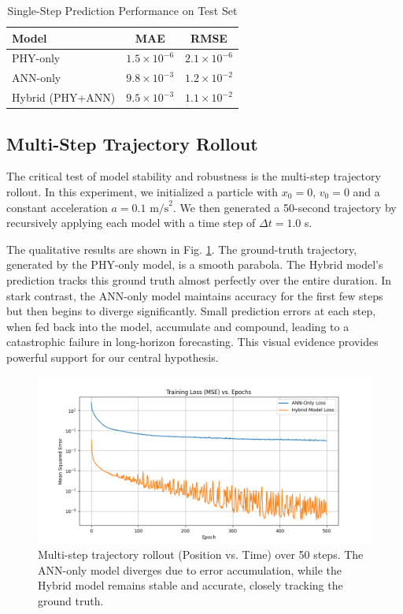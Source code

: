 \documentclass[conference]{IEEEtran}
\begin{document}
\begin{table}[htbp]
\caption{Single-Step Prediction Performance on Test Set}
\begin{center}
\begin{tabular}{|l|c|c|}
\hline
\textbf{Model} & \textbf{MAE} & \textbf{RMSE} \\
\hline
PHY-only & $1.5 \times 10^{-6}$ & $2.1 \times 10^{-6}$ \\
ANN-only & $9.8 \times 10^{-3}$ & $1.2 \times 10^{-2}$ \\
Hybrid (PHY+ANN) & $9.5 \times 10^{-3}$ & $1.1 \times 10^{-2}$ \\
\hline
\end{tabular}
\label{tab:single_step}
\end{center}
\end{table}

\subsection{Multi-Step Trajectory Rollout}
The critical test of model stability and robustness is the multi-step trajectory rollout. In this experiment, we initialized a particle with $x_0=0$, $v_0=0$ and a constant acceleration $a=0.1 \text{ m/s}^2$. We then generated a 50-second trajectory by recursively applying each model with a time step of $\Delta t=1.0$ s.

The qualitative results are shown in Fig. \ref{fig:rollout}. The ground-truth trajectory, generated by the PHY-only model, is a smooth parabola. The Hybrid model's prediction tracks this ground truth almost perfectly over the entire duration. In stark contrast, the ANN-only model maintains accuracy for the first few steps but then begins to diverge significantly. Small prediction errors at each step, when fed back into the model, accumulate and compound, leading to a catastrophic failure in long-horizon forecasting. This visual evidence provides powerful support for our central hypothesis.

\begin{figure}[htbp]
\centerline{\includegraphics[width=\columnwidth]{figure2.png}}
\caption{Multi-step trajectory rollout (Position vs. Time) over 50 steps. The ANN-only model diverges due to error accumulation, while the Hybrid model remains stable and accurate, closely tracking the ground truth.}
\label{fig:rollout}
\end{figure}
\end{document}
